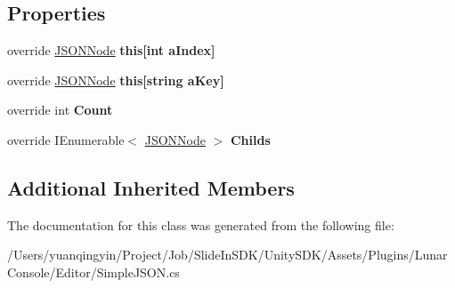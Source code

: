 \subsection*{Properties}
\begin{DoxyCompactItemize}
\item 
\mbox{\label{class_lunar_console_editor_internal_1_1_j_s_o_n_array_a4e6681eefecb8ac690127cdee2d5c369}} 
override \mbox{\hyperlink{class_lunar_console_editor_internal_1_1_j_s_o_n_node}{J\+S\+O\+N\+Node}} {\bfseries this\mbox{[}int a\+Index\mbox{]}}
\item 
\mbox{\label{class_lunar_console_editor_internal_1_1_j_s_o_n_array_a43d8b352eceaa38fdd880eed203be3d5}} 
override \mbox{\hyperlink{class_lunar_console_editor_internal_1_1_j_s_o_n_node}{J\+S\+O\+N\+Node}} {\bfseries this\mbox{[}string a\+Key\mbox{]}}
\item 
\mbox{\label{class_lunar_console_editor_internal_1_1_j_s_o_n_array_a1984c2311d3bf0b46c52161b640ae83b}} 
override int {\bfseries Count}
\item 
\mbox{\label{class_lunar_console_editor_internal_1_1_j_s_o_n_array_a9103dd168ff4830cae0f433be4724676}} 
override I\+Enumerable$<$ \mbox{\hyperlink{class_lunar_console_editor_internal_1_1_j_s_o_n_node}{J\+S\+O\+N\+Node}} $>$ {\bfseries Childs}
\end{DoxyCompactItemize}
\subsection*{Additional Inherited Members}


The documentation for this class was generated from the following file\+:\begin{DoxyCompactItemize}
\item 
/\+Users/yuanqingyin/\+Project/\+Job/\+Slide\+In\+S\+D\+K/\+Unity\+S\+D\+K/\+Assets/\+Plugins/\+Lunar\+Console/\+Editor/Simple\+J\+S\+O\+N.\+cs\end{DoxyCompactItemize}
